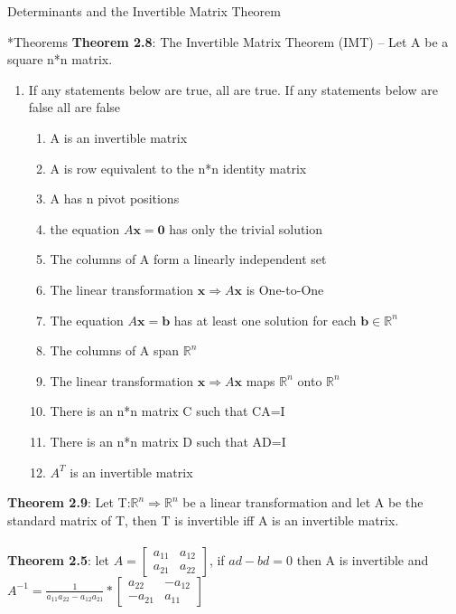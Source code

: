\documentclass[a4paper, 12pt]{article}
\begin{document}
\newpage
\begin{section}{Determinants and the Invertible Matrix Theorem}
\begin{subsection}*{Theorems}
\textbf{Theorem 2.8}: The Invertible Matrix Theorem (IMT) -- Let A be a
square n*n matrix.
\begin{enumerate}
\item{If any statements below are true, all are true. 
If any statements below are false all are false}
\begin{enumerate}
\item{A is an invertible matrix}
\item{A is row equivalent to the n*n identity matrix}
\item{A has n pivot positions}
\item{the equation $A\textbf{x}=\textbf{0}$ has only the trivial solution}
\item{The columns of A form a linearly independent set}
\item{The linear transformation $\textbf{x}\Rightarrow A\textbf{x}$ 
	is One-to-One}
\item{The equation $A\textbf{x}=\textbf{b}$ has at least one
	solution for each $\textbf{b}\in\mathbb{R}^n$}
\item{The columns of A span $\mathbb{R}^n$}
\item{The linear transformation $\textbf{x}\Rightarrow A\textbf{x}$
	maps $\mathbb{R}^n$ onto $\mathbb{R}^n$}
\item{There is an n*n matrix C such that CA=I}
\item{There is an n*n matrix D such that AD=I}
\item{$A^T$ is an invertible matrix}
\end{enumerate} \end{enumerate}
\textbf{Theorem 2.9}: Let T:$\mathbb{R}^n\Rightarrow\mathbb{R}^n$
be a linear transformation and let A be the standard matrix of T,
then T is invertible iff A is an invertible matrix.
\\
\\\textbf{Theorem 2.5}: let 
$A=\begin{bmatrix} a_{11} & a_{12} \\ a_{21} & a_{22} 
\end{bmatrix}$, if $ad-bd=0$ then A is invertible and 
\\$A^{-1}=\frac{1}{a_{11}a_{22}-a_{12}a_{21}}*
\begin{bmatrix} a_{22} & -a_{12} \\ -a_{21} & a_{11} \end{bmatrix}$\\

\end{subsection}
\end{section}
\end{document}
